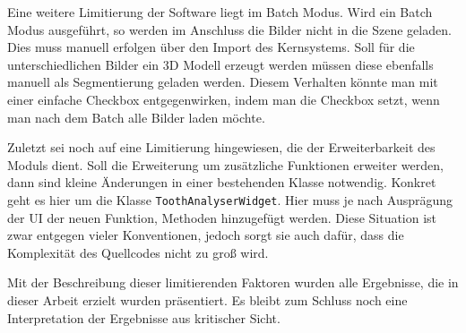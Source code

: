 Eine weitere Limitierung der Software liegt im Batch Modus. Wird ein Batch Modus
ausgeführt, so werden im Anschluss die Bilder nicht in die Szene geladen. Dies
muss manuell erfolgen über den Import des Kernsystems. Soll für die unterschiedlichen
Bilder ein \ac{3D} Modell erzeugt werden müssen diese ebenfalls manuell als
Segmentierung geladen werden. Diesem Verhalten könnte man mit einer einfache Checkbox
entgegenwirken, indem man die Checkbox setzt, wenn man nach dem Batch alle Bilder
laden möchte.

Zuletzt sei noch auf eine Limitierung hingewiesen, die der Erweiterbarkeit des
Moduls dient. Soll die Erweiterung um zusätzliche Funktionen erweiter werden,
dann sind kleine Änderungen in einer bestehenden Klasse notwendig. Konkret geht es
hier um die Klasse \texttt{ToothAnalyserWidget}. Hier muss je nach Ausprägung der
\ac{UI} der neuen Funktion, Methoden hinzugefügt werden. Diese Situation ist
zwar entgegen vieler Konventionen, jedoch sorgt sie auch dafür, dass die
Komplexität des Quellcodes nicht zu groß wird.

Mit der Beschreibung dieser limitierenden Faktoren wurden alle Ergebnisse, die in
dieser Arbeit erzielt wurden präsentiert. Es bleibt zum Schluss noch eine
Interpretation der Ergebnisse aus kritischer Sicht.
